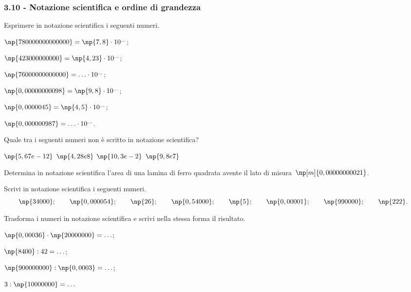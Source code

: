 \subsubsection*{3.10 - Notazione scientifica e ordine di grandezza}

\begin{esercizio}
 \label{ese:3.66}
Esprimere in notazione scientifica i seguenti numeri.
\begin{multicols}{2}
\begin{enumeratea}
\item $\np{780000000000000}=\np{7,8}\cdot10^{\ldots}$;
\item $\np{423000000000}=\np{4,23}\cdot10^{\ldots}$;
\item $\np{76000000000000}= \ldots \cdot 10^{\ldots}$;
\item $\np{0,00000000098}=\np{9,8}\cdot10^{\ldots}$;
\item $\np{0,0000045}=\np{4,5}\cdot10^{\ldots}$;
\item $\np{0,000000987}= \ldots \cdot 10^{\ldots}$.
\end{enumeratea}
\end{multicols}
\end{esercizio}

\begin{esercizio}
 \label{ese:3.67}
Quale tra i seguenti numeri non è scritto in notazione scientifica?

\boxA\quad$\np{5,67e-12}$\qquad
\boxB\quad$\np{4,28e8}$\qquad
\boxC\quad$\np{10,3e-2}$\qquad
\boxD\quad$\np{9,8e7}$\qquad
\end{esercizio}

\begin{esercizio}
 \label{ese:3.68}
Determina in notazione scientifica l'area di una lamina di ferro quadrata
avente il lato di misura~$\np[m]{0,00000000021}$.
\end{esercizio}

\begin{esercizio}
 \label{ese:3.69}
Scrivi in notazione scientifica i seguenti numeri.
\[\np{34000};\qquad\np{0,000054};\qquad\np{26};\qquad\np{0,54000};\qquad\np{5};\qquad\np{0,00001};\qquad\np{990000};\qquad\np{222}.\]
\end{esercizio}
\pagebreak
\begin{esercizio}
 \label{ese:3.70}
Trasforma i numeri in notazione scientifica e scrivi nella stessa forma il risultato.
\begin{multicols}{2}
\begin{enumeratea}
\item $\np{0,00036}\cdot\np{20000000}=\ldots$;
\item $\np{8400}:42=\ldots$;
\item $\np{900000000}:\np{0,0003}=\ldots$;
\item $3:\np{10000000}=\ldots$
\end{enumeratea}
\end{multicols}
\end{esercizio}

